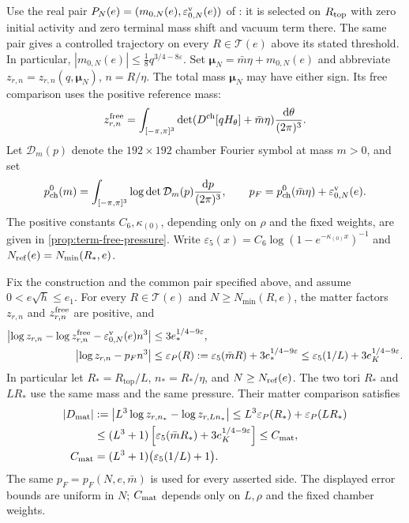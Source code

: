 \documentclass[11pt,letterpaper,reqno]{amsart}
\newcommand{\dd}{\mathrm d}
\begin{document}
Use the real pair
$P_N(e)=(m_{0,N}(e),\varepsilon_{0,N}^{\rm v}(e))$
of \cite[Theorem~D]{CoverTuning}: it is selected on
$R_{\rm top}$ with zero initial activity and zero terminal
mass shift and vacuum term there. The same pair gives a controlled
trajectory on every $R\in\mathcal T(e)$ above its stated threshold.
In particular,
$|m_{0,N}(e)|\le\frac18 q^{3/4-8\varepsilon}$.
Set $\boldsymbol\mu_N=\bar m\eta+m_{0,N}(e)$ and abbreviate
$z_{r,n}=z_{r,n}(q,\boldsymbol\mu_N)$, $n=R/\eta$.
The total mass $\boldsymbol\mu_N$ may have either sign.
Its free comparison uses the positive reference mass:
\[
 z_{r,n}^{\rm free}
   =\int_{[-\pi,\pi]^3}
        \det(D^{\rm ch}[qH_\theta]+\bar m\eta)
                      \frac{\dd\theta}{(2\pi)^3}.
\]
Let $\mathcal D_m(p)$ denote the $192\times192$ chamber Fourier
symbol at mass $m>0$, and set
\begin{equation}\label{eq:term-common-pressure}
 p_{\rm ch}^0(m)=\int_{[-\pi,\pi]^3}
                   \log\det\mathcal D_m(p)\frac{\dd p}{(2\pi)^3},
 \qquad
 p_F=p_{\rm ch}^0(\bar m\eta)+\varepsilon_{0,N}^{\rm v}(e).
\end{equation}
The positive constants $C_6,\kappa_{(0)}$, depending only on $\rho$
and the fixed weights, are given in
\cref{prop:term-free-pressure}. Write
$\varepsilon_5(x)=C_6\log(1-e^{-\kappa_{(0)}x})^{-1}$ and
$N_{\rm ref}(e)=N_{\min}(R_*,e)$.
\begin{theorem}\label{thm:term-common-partition}
Fix the construction and the common pair specified above, and
assume $0<e\sqrt h\le e_1$. For every $R\in\mathcal T(e)$ and
$N\ge N_{\min}(R,e)$, the matter factors $z_{r,n}$ and $z_{r,n}^{\rm free}$ are positive, and
\begin{align}
 \left|\log z_{r,n}-\log z_{r,n}^{\rm free}
                      -\varepsilon_{0,N}^{\rm v}(e)n^3\right|
          &\le3e_*^{1/4-9\varepsilon},\nonumber\\
 \left|\log z_{r,n}-p_Fn^3\right|
          &\le\varepsilon_P(R)
             :=\varepsilon_5(\bar mR)+3e_*^{1/4-9\varepsilon}
          \le\varepsilon_5(1/L)+3e_K^{1/4-9\varepsilon}.
                                     \label{eq:term-common-pressure-bound}
\end{align}
In particular let $R_*=R_{\mathrm{top}}/L$,
$n_*=R_*/\eta$, and $N\ge N_{\rm ref}(e)$.
The two tori $R_*$ and $LR_*$ use the same mass and
the same pressure. Their matter comparison satisfies
\begin{align}
 |D_{\rm mat}|
 &:=\left|L^3\log z_{r,n_*}-\log z_{r,Ln_*}\right|
       \le L^3\varepsilon_P(R_*)+\varepsilon_P(LR_*)
       \nonumber\\
 &\le (L^3+1)
          \left[\varepsilon_5(\bar mR_*)
                                      +3e_K^{1/4-9\varepsilon}\right]
       \le C_{\rm mat},\nonumber\\
 C_{\rm mat}&=(L^3+1)\bigl(\varepsilon_5(1/L)+1\bigr).
                                     \label{eq:term-matter-comparison}
\end{align}
The same $p_F=p_F(N,e,\bar m)$ is used for every asserted side.
The displayed error bounds are uniform in $N$; $C_{\rm mat}$
depends only on $L,\rho$ and the fixed chamber weights.
\end{theorem}
\end{document}
